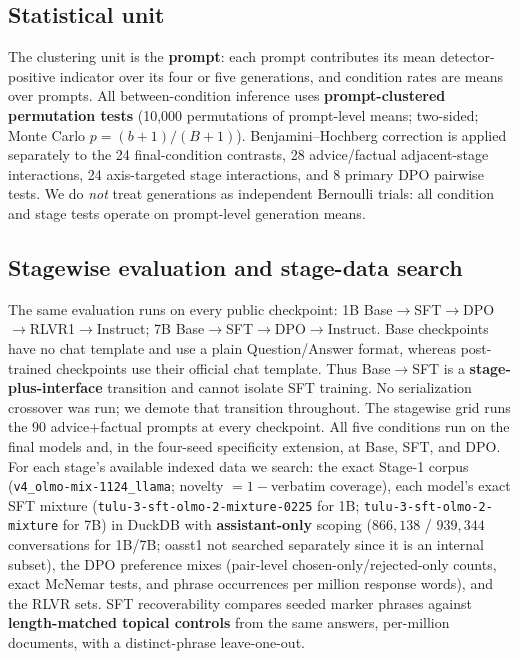\documentclass[11pt]{article}
\begin{document}
\subsection{Statistical unit}
\label{sec:method-stats}
The clustering unit is the \textbf{prompt}: each prompt contributes its mean
detector-positive indicator over its four or five generations, and condition rates are means over
prompts. All between-condition inference uses \textbf{prompt-clustered
permutation tests} (10{,}000 permutations of prompt-level means; two-sided;
Monte Carlo $p=(b+1)/(B+1)$). Benjamini--Hochberg correction is applied
separately to the 24 final-condition contrasts, 28 advice/factual adjacent-stage
interactions, 24 axis-targeted stage interactions, and 8 primary DPO pairwise tests.
We do \emph{not} treat generations as independent Bernoulli trials:
all condition and stage tests operate on prompt-level generation means.

\subsection{Stagewise evaluation and stage-data search}
\label{sec:method-stagewise}
The same evaluation runs on every public checkpoint: 1B
Base$\to$SFT$\to$DPO$\to$RLVR1$\to$Instruct; 7B
Base$\to$SFT$\to$DPO$\to$Instruct. Base checkpoints have no chat template and
use a plain Question/Answer format, whereas post-trained checkpoints use their
official chat template. Thus Base$\to$SFT is a \textbf{stage-plus-interface}
transition and cannot isolate SFT training. No serialization crossover was run;
we demote that transition throughout. The
stagewise grid runs the 90 advice$+$factual prompts at every checkpoint. All five
conditions run on the final models and, in the four-seed specificity extension,
at Base, SFT, and DPO. For each stage's available indexed data we search: the exact Stage-1 corpus
(\texttt{v4\_olmo-mix-1124\_llama}; novelty $=1-$verbatim coverage), each
model's exact SFT mixture (\texttt{tulu-3-sft-olmo-2-mixture-0225} for 1B;
\texttt{tulu-3-sft-olmo-2-mixture} for 7B) in DuckDB with \textbf{assistant-only} scoping
($866{,}138$ / $939{,}344$ conversations for 1B/7B; oasst1 not searched
separately since it is an internal subset), the DPO preference mixes
(pair-level chosen-only/rejected-only counts, exact McNemar tests, and phrase
occurrences per million response words), and the
RLVR sets. SFT recoverability compares seeded marker phrases against
\textbf{length-matched topical controls} from the same answers, per-million
documents, with a distinct-phrase leave-one-out.
\end{document}
